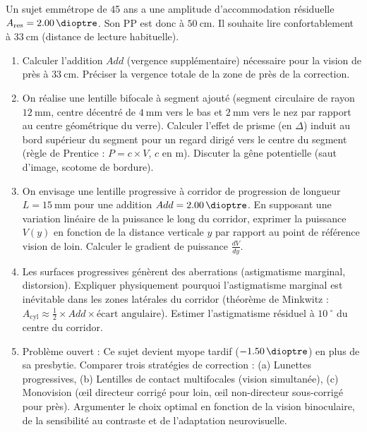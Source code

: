 \documentclass[11pt]{article}
\providecommand{\degree}{^{\circ}}
\begin{document}
\begin{exercice}
Un sujet emmétrope de 45 ans a une amplitude d'accommodation résiduelle $A_{\text{res}} = \SI{2,00}{\dioptre}$. Son PP est donc à $\SI{50}{\centi\metre}$. Il souhaite lire confortablement à $\SI{33}{\centi\metre}$ (distance de lecture habituelle).
\begin{enumerate}
    \item Calculer l'addition $Add$ (vergence supplémentaire) nécessaire pour la vision de près à $\SI{33}{\centi\metre}$. Préciser la vergence totale de la zone de près de la correction.
    \item On réalise une lentille bifocale à segment ajouté (segment circulaire de rayon $\SI{12}{\milli\metre}$, centre décentré de $\SI{4}{\milli\metre}$ vers le bas et $\SI{2}{\milli\metre}$ vers le nez par rapport au centre géométrique du verre). Calculer l'effet de prisme (en $\Delta$) induit au bord supérieur du segment pour un regard dirigé vers le centre du segment (règle de Prentice : $P = c \times V$, $c$ en m). Discuter la gêne potentielle (saut d'image, scotome de bordure).
    \item On envisage une lentille progressive à corridor de progression de longueur $L = \SI{15}{\milli\metre}$ pour une addition $Add = \SI{2,00}{\dioptre}$. En supposant une variation linéaire de la puissance le long du corridor, exprimer la puissance $V(y)$ en fonction de la distance verticale $y$ par rapport au point de référence vision de loin. Calculer le gradient de puissance $\frac{dV}{dy}$.
    \item Les surfaces progressives génèrent des aberrations (astigmatisme marginal, distorsion). Expliquer physiquement pourquoi l'astigmatisme marginal est inévitable dans les zones latérales du corridor (théorème de Minkwitz : $A_{\text{cyl}} \approx \frac{1}{2} \times Add \times \text{écart angulaire}$). Estimer l'astigmatisme résiduel à $\SI{10}{\degree}$ du centre du corridor.
    \item Problème ouvert : Ce sujet devient myope tardif ($\SI{-1,50}{\dioptre}$) en plus de sa presbytie. Comparer trois stratégies de correction : (a) Lunettes progressives, (b) Lentilles de contact multifocales (vision simultanée), (c) Monovision (œil directeur corrigé pour loin, œil non-directeur sous-corrigé pour près). Argumenter le choix optimal en fonction de la vision binoculaire, de la sensibilité au contraste et de l'adaptation neurovisuelle.
\end{enumerate}
\end{exercice}
\end{document}
